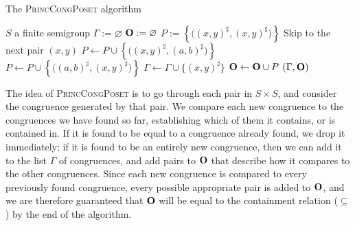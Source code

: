 \begin{algorithm}
  \caption{The \textsc{PrincCongPoset} algorithm}
  \label{alg:princ-cong-poset}
  \begin{algorithmic}[1]
    \Require $S$ a finite semigroup
      \State $\Gamma := \varnothing$
      \State $\mathbf{O} := \varnothing$
        \State $P := \left\{\big((x,y)^\sharp, (x,y)^\sharp\big)\right\}$
              \State Skip to the next pair $(x,y)$
            \Else
              \State $P \gets P \cup
                \left\{\big((x,y)^\sharp, (a,b)^\sharp\big)\right\}$
            \EndIf
              \State $P \gets P \cup
                \left\{\big((a,b)^\sharp, (x,y)^\sharp\big)\right\}$
          \EndIf
        \EndFor
        \State $\Gamma \gets \Gamma \cup \{(x,y)^\sharp\}$
        \State $\mathbf{O} \gets \mathbf{O} \cup P$
      \EndFor
      \State \Return $(\Gamma, \mathbf{O})$
    \EndProcedure
  \end{algorithmic}
\end{algorithm}

The idea of \textsc{PrincCongPoset} is to go through each pair in $S \times S$,
and consider the congruence generated by that pair.  We compare each new
congruence to the congruences we have found so far, establishing which of them
it contains, or is contained in.  If it is found to be equal to a congruence
already found, we drop it immediately; if it is found to be an entirely new
congruence, then we can add it to the list $\Gamma$ of congruences, and add
pairs to $\mathbf{O}$ that describe how it compares to the other congruences.  Since
each new congruence is compared to every previously found congruence, every
possible appropriate pair is added to $\mathbf{O}$, and we are therefore guaranteed
that $\mathbf{O}$ will be equal to the containment relation ($\subseteq$) by the end of
the algorithm.

